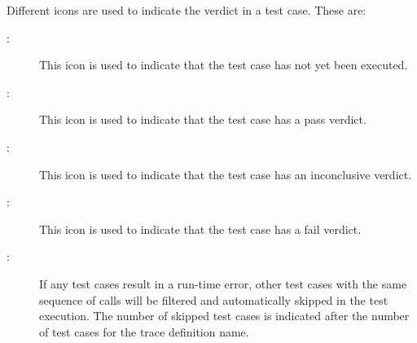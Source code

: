 \documentclass{overturerepchap}
\begin{document}
Different icons are used to indicate the verdict in a test
case. These are:
\begin{description}
\item[\hspace{-1.8mm}
:]
  This icon is used to indicate that the test case has not yet been
  executed.
\item[\hspace{-1.8mm}
:]
  This icon is used to indicate that the test case has a pass
  verdict.
\item[\hspace{-1.8mm}
:]
  This icon is used to indicate that the test case has an inconclusive
  verdict.
\item[\hspace{-1.8mm}
:]
  This icon is used to indicate that the test case has a fail
  verdict.
\item[\hspace{-1.8mm}
:]
If any test cases result in a run-time error, other test cases with the
same sequence of calls will be filtered and automatically skipped in the test
execution. The number of skipped test cases is indicated after the number
of test cases for the trace definition name.
\end{description}
\end{document}
